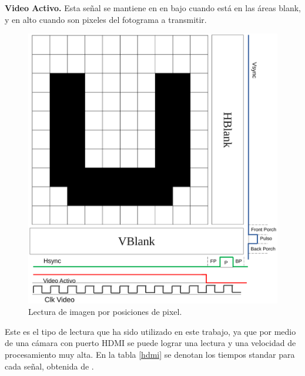 \documentclass[twoside,spanish,ESP,MSc]{plantillaLabUPV}
\theoremstyle{definition}
\begin{document}
\begin{enumerate}
 \checkmark\textbf{Video Activo.} Esta señal se mantiene en en bajo cuando está en las áreas blank, y en alto cuando son pixeles del fotograma a transmitir.
 
 
 \begin{figure}[h]
 	\centering
 	\includegraphics[scale=0.3]{edrawimas/scanU}
 	\caption{Lectura de imagen por posiciones de pixel. 
 		\label{scanU}}
 \end{figure}
 
\end{enumerate}

Este es el tipo de lectura que ha sido utilizado en este trabajo, ya que por medio de una cámara con puerto HDMI se puede lograr una lectura y una velocidad de procesamiento muy alta. En la tabla \ref{hdmi} se denotan los tiempos standar para cada señal, obtenida de \cite{demisti}.
\end{document}

